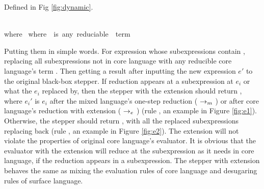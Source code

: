 \begin{Def} Defined in Fig \ref{fig:dynamic}.



\end{Def}

\begin{figure*}[t]
{}
{\\where~}
{}
\scriptsize{where~~is~any~reduciable~~term}
\caption{Dynamic reduction}
\label{fig:dynamic}
\end{figure*}


Putting them in simple words. For expression  whose subexpressions contain , replacing all  subexpressions not in core language with any reducible core language's term . Then getting a result after inputting the new expression $e'$ to the original black-box stepper. If reduction appears at a subexpression at $e_i$ or what the $e_i$ replaced by, then the stepper with the extension should return , where $e_i'$ is $e_i$ after the mixed language's one-step reduction ($~\rightarrow_m~$) or after core language's reduction with extension ($~\rightarrow_e~$) (rule , an example in Figure \ref{fig:e1}). Otherwise, the stepper should return , with all the replaced subexpressions replacing back (rule , an example in Figure \ref{fig:e2}). The extension will not violate the properties of original core language's evaluator. It is obvious that the evaluator with the extension will reduce at the subexpression as it needs in core language, if the reduction appears in a subexpression. The stepper with extension behaves the same as mixing the evaluation rules of core language and desugaring rules of surface language.

